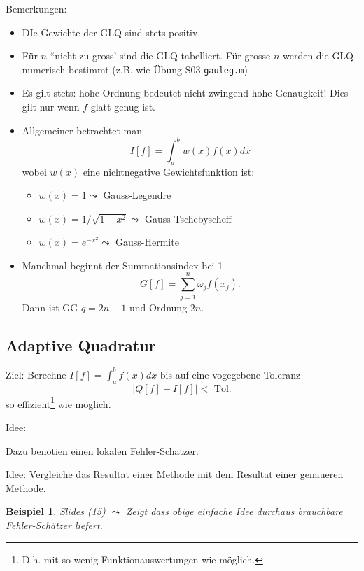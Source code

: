 \documentclass[a4paper]{article}
\newtheorem{bsp}{Beispiel}
\begin{document}
Bemerkungen:
\begin{itemize}
  \item DIe Gewichte der GLQ sind stets positiv.
  \item Für $n$ ``nicht zu gross' sind die GLQ tabelliert. F\"ur grosse $n$
    werden die GLQ numerisch bestimmt (z.B. wie \"Ubung S03 \texttt{gauleg.m})
  \item Es gilt stets: hohe Ordnung bedeutet nicht zwingend hohe Genaugkeit!
    Dies gilt nur wenn $f$ glatt genug ist.
  \item Allgemeiner betrachtet man
    \[
      I[f] = \int_a^b w(x) f(x) dx
    \]
    wobei $w(x)$ eine nichtnegative Gewichtsfunktion ist:
    \begin{itemize}
      \item $w(x) = 1 \leadsto$ Gauss-Legendre
      \item $w(x) = 1/\sqrt{1 - x^2} \leadsto$ Gauss-Tschebyscheff
      \item $w(x) = e^{-x^2} \leadsto$ Gauss-Hermite
    \end{itemize}
  \item Manchmal beginnt der Summationsindex bei 1
    \[
      G[f] = \sum_{j=1}^n \omega_j f(x_j).
    \]
    Dann ist GG $q = 2n-1$ und Ordnung $2n$.
\end{itemize}

\subsection{Adaptive Quadratur}

Ziel: Berechne $I[f] = \int_a^b f(x) dx$
bis auf eine vogegebene Toleranz
\[
  |Q[f] - I[f]| < \text{ Tol.}
\]
so effizient\footnote{D.h. mit so wenig Funktionauswertungen wie m\"oglich.} wie m\"oglich.

Idee:

\begin{center}
  \skelfig
\end{center}

Dazu benötien einen lokalen Fehler-Sch\"atzer.

Idee: Vergleiche das Resultat einer Methode mit dem Resultat einer genaueren
Methode.

\begin{bsp}
  Slides (15) $\leadsto$ Zeigt dass obige einfache Idee durchaus brauchbare
  Fehler-Sch\"ätzer liefert.
\end{bsp}
\end{document}
